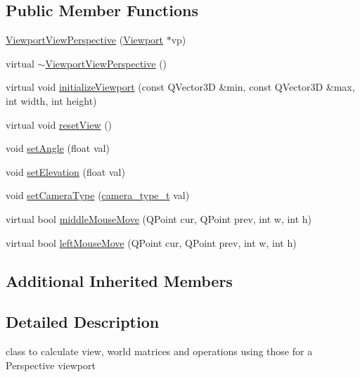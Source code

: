\subsection*{Public Member Functions}
\begin{DoxyCompactItemize}
\item 
\hyperlink{classShipCAD_1_1ViewportViewPerspective_a670a0691b0d02fadd13bf210026efcf1}{Viewport\-View\-Perspective} (\hyperlink{classShipCAD_1_1Viewport}{Viewport} $\ast$vp)
\item 
virtual \hyperlink{classShipCAD_1_1ViewportViewPerspective_a3424a48490558e39959161ee9b5da692}{$\sim$\-Viewport\-View\-Perspective} ()
\item 
virtual void \hyperlink{classShipCAD_1_1ViewportViewPerspective_af96ca2b448d261206e360b1304510a65}{initialize\-Viewport} (const Q\-Vector3\-D \&min, const Q\-Vector3\-D \&max, int width, int height)
\item 
virtual void \hyperlink{classShipCAD_1_1ViewportViewPerspective_ab3cc69a6cdb3271cc9e79ec16aa37a33}{reset\-View} ()
\item 
void \hyperlink{classShipCAD_1_1ViewportViewPerspective_ad6d853a15bc9015d43e4c052471f2cb1}{set\-Angle} (float val)
\item 
void \hyperlink{classShipCAD_1_1ViewportViewPerspective_ad09e4532f81905f9ea90545b0b6d4856}{set\-Elevation} (float val)
\item 
void \hyperlink{classShipCAD_1_1ViewportViewPerspective_ab1a56bd7cb986e2c3163bcacd201d32d}{set\-Camera\-Type} (\hyperlink{namespaceShipCAD_a58f51ebd2e66de5e41c2ffd6f434241e}{camera\-\_\-type\-\_\-t} val)
\item 
virtual bool \hyperlink{classShipCAD_1_1ViewportViewPerspective_a1de2fd402609b54c79c2d70390ba4a64}{middle\-Mouse\-Move} (Q\-Point cur, Q\-Point prev, int w, int h)
\item 
virtual bool \hyperlink{classShipCAD_1_1ViewportViewPerspective_a11f5f04a95646a701743804c4d7c1d10}{left\-Mouse\-Move} (Q\-Point cur, Q\-Point prev, int w, int h)
\end{DoxyCompactItemize}
\subsection*{Additional Inherited Members}


\subsection{Detailed Description}
class to calculate view, world matrices and operations using those for a Perspective viewport 

